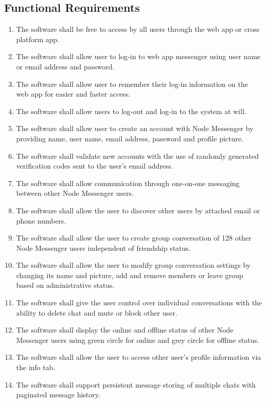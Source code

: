 \documentclass[12pt, titlepage]{article}
\begin{document}
    	\subsection{Functional Requirements}
	    \begin{enumerate}
		    \item The software shall be free to access by all users through the web app or cross platform app.
		    \item The software shall allow user to log-in to web app messenger using user name or email address and password.
		    \item The software shall allow user to remember their log-in information on the web app for easier and faster access.
		    \item The software shall allow users to log-out and log-in to the system at will.
		    \item The software shall allow user to create an account with Node Messenger by providing name, user name, email address, password and profile picture.
		    \item The software shall validate new accounts with the use of randomly generated verification codes sent to the user's email address.
		    \item The software shall allow communication through one-on-one messaging between other Node Messenger users.
		    \item The software shall allow the user to discover other users by attached email or phone numbers.
		    \item The software shall allow the user to create group
		    conversation of 128 other Node Messenger users independent of friendship status.
		    \item The software shall allow the user to modify group conversation settings by changing its name and picture, add and remove members or leave group based on administrative status.
		    \item The software shall give the user control over individual conversations with the ability to delete chat and mute or block other user.
		    \item The software shall display the online and offline status of other Node Messenger users using green circle for online and grey circle for offline status.
		    \item The software shall allow the user to access other user's profile information via the info tab.
		    \item The software shall support persistent message storing of multiple chats with paginated message history.

\end{enumerate}
\end{document}
